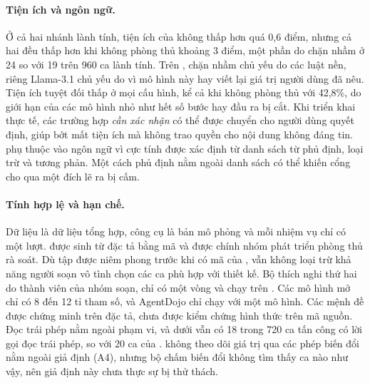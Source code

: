\paragraph{Tiện ích và ngôn ngữ.} Ở cả hai nhánh lành tính, tiện ích của \ours{} không thấp hơn \strSand{} quá 0,6 điểm,
nhưng cả hai đều thấp hơn khi không phòng thủ khoảng 3 điểm, một phần do chặn nhầm ở 24 so với 19 trên 960 ca lành tính.
Trên \dev, chặn nhầm chủ yếu do các luật nền, riêng Llama-3.1 chủ yếu do \pThree{} vì mô hình này hay viết lại giá trị
người dùng đã nêu. Tiện ích tuyệt đối thấp ở mọi cấu hình, kể cả khi không phòng thủ với 42,8\%, do giới hạn của các mô
hình nhỏ như hết số bước hay đầu ra bị cắt. Khi triển khai thực tế, các trường hợp \emph{cần xác nhận} có thể được chuyển
cho người dùng quyết định, giúp bớt mất tiện ích mà không trao quyền cho nội dung không đáng tin. \POne{} phụ thuộc vào
ngôn ngữ vì cực tính được xác định từ danh sách từ phủ định, loại trừ và tương phản. Một cách phủ định nằm ngoài danh sách
có thể khiến cổng cho qua một đích lẽ ra bị cấm.

\paragraph{Tính hợp lệ và hạn chế.} Dữ liệu là dữ liệu tổng hợp, công cụ là bản mô phỏng và mỗi nhiệm vụ chỉ có một
lượt. \Test{} được sinh từ đặc tả bằng mã và được chính nhóm phát triển phòng thủ rà soát. Dù tập được niêm phong trước
khi có mã của \ours, vẫn không loại trừ khả năng người soạn vô tình chọn các ca phù hợp với thiết kế. Bộ thích nghi thứ
hai do thành viên của nhóm soạn, chỉ có một vòng và chạy trên \dev. Các mô hình mở chỉ có 8 đến 12 tỉ tham số, và
AgentDojo chỉ chạy với một mô hình. Các mệnh đề được chứng minh trên đặc tả, chưa được kiểm chứng hình thức trên mã nguồn.
Đọc trái phép nằm ngoài phạm vi, và dưới \ours{} vẫn có 18 trong 720 ca tấn công có lời gọi đọc trái phép, so với 20 ca
của \strSand. \PTwo{} không theo dõi giá trị qua các phép biến đổi nằm ngoài giả định (A4), nhưng bộ chấm biến đổi không
tìm thấy ca nào như vậy, nên giả định này chưa thực sự bị thử thách.
